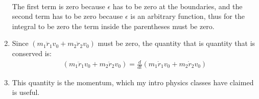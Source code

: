 \documentclass[12pt]{article}
\newcommand{\der}[2]{\frac{d #1}{d #2}}
\begin{document}
\begin{enumerate}
\begin{gather}
    \end{gather}
    The first term is zero because $\epsilon$ has to be zero at the boundaries, and the second term has to be zero because $\epsilon$ is an arbitrary function, thus for the integral to be zero the term inside the parentheses must be zero.
    \item Since $\left(m_1 \ddot{r}_1 v_0+m_2 \ddot{r}_2 v_0\right)$ must be zero, the quantity that is quantity that is conserved is:
    \begin{gather}
      \left(m_1 \ddot{r}_1 v_0+m_2 \ddot{r}_2 v_0\right)=\der{}{t}\left(m_1 \dot{r}_1 v_0+m_2 \dot{r}_2 v_0\right)
    \end{gather}
    \item This quantity is the momentum, which my intro physics classes have claimed is useful.
  \end{enumerate}
\end{document}
